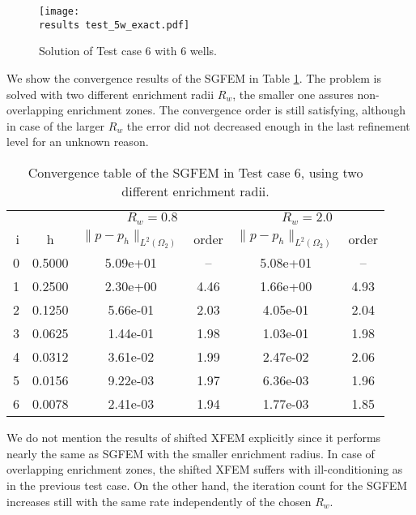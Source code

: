 %
\begin{figure}[!htb]
  \centering    
    \texttt{[image: \\results test\_5w\_exact.pdf]}
  \caption{Solution of Test case 6 with 6 wells. }
  \label{fig:test_5w_exact}
\end{figure}
%

We show the convergence results of the SGFEM in Table \ref{tab:convergence_test6}. The problem is solved with
two different enrichment radii $R_w$, the smaller one assures non-overlapping enrichment zones.
The convergence order is still satisfying, although in case of the larger $R_w$ the error did not decreased enough
in the last refinement level for an unknown reason.
\begin{table}[!htb]
\begin{center}
\bgroup
\def\arraystretch{1.2}
\setlength\tabcolsep{5pt}
\begin{tabular}{rc|cc|cc}
\toprule
\multicolumn{2}{c|}{} & \multicolumn{2}{c|}{$R_w=0.8$} & \multicolumn{2}{c}{$R_w=2.0$}\\ [3pt] %
i & h & $\|p-p_h\|_{L^2(\Omega_2)}$ & order & $\|p-p_h\|_{L^2(\Omega_2)}$ & order \\ [3pt] \midrule
0 & 0.5000 & 5.09e+01 & --   & 5.08e+01 & --   \\ %
1 & 0.2500 & 2.30e+00 & 4.46 & 1.66e+00 & 4.93 \\ %
2 & 0.1250 & 5.66e-01 & 2.03 & 4.05e-01 & 2.04 \\ %
3 & 0.0625 & 1.44e-01 & 1.98 & 1.03e-01 & 1.98 \\ %
4 & 0.0312 & 3.61e-02 & 1.99 & 2.47e-02 & 2.06 \\ %
5 & 0.0156 & 9.22e-03 & 1.97 & 6.36e-03 & 1.96 \\ %
6 & 0.0078 & 2.41e-03 & 1.94 & 1.77e-03 & 1.85 \\ %
\bottomrule
\end{tabular}
\caption{Convergence table of the SGFEM in Test case 6, using two different enrichment radii.}
\label{tab:convergence_test6}
\egroup
\end{center}
\end{table}

We do not mention the results of shifted XFEM explicitly since it performs nearly the same as SGFEM with the smaller enrichment radius.
In case of overlapping enrichment zones, the shifted XFEM suffers with ill-conditioning as in the previous test case.
On the other hand, the iteration count for the SGFEM increases still with the same rate independently of the chosen $R_w$.



